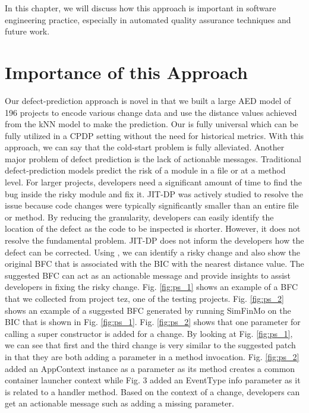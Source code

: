 In this chapter, we will discuss how this approach is important in software engineering practice, especially in automated quality assurance techniques and future work.

\section{Importance of this Approach}
Our defect-prediction approach is novel in that we built a large AED model of 196 projects to encode various change data and use the distance values achieved from the kNN model to make the prediction.
Our {\simfinmo} is fully universal which can be fully utilized in a CPDP setting without the need for historical metrics.
With this approach, we can say that the cold-start problem is fully alleviated.
Another major problem of defect prediction is the lack of actionable messages.
Traditional defect-prediction models predict the risk of a module in a file or at a method level.
For larger projects, developers need a significant amount of time to find the bug inside the risky module and fix it.
JIT-DP was actively studied to resolve the issue because code changes were typically significantly smaller than an entire file or method.
By reducing the granularity, developers can easily identify the location of the defect as the code to be inspected is shorter.
However, it does not resolve the fundamental problem.
JIT-DP does not inform the developers how the defect can be corrected.
Using {\simfinmo}, we can identify a risky change and also show the original BFC that is associated with the BIC with the nearest distance value.
The suggested BFC can act as an actionable message and provide insights to assist developers in fixing the risky change.
Fig. \ref{fig:ps_1} shows an example of a BFC that we collected from project tez, one of the testing projects.
Fig. \ref{fig:ps_2} shows an example of a suggested BFC generated by running SimFinMo on the BIC that is shown in Fig. \ref{fig:ps_1}.
Fig. \ref{fig:ps_2} shows that one parameter for calling a super constructor is added for a change.
By looking at Fig. \ref{fig:ps_1}, we can see that first and the third change is very similar to the suggested patch in that they are both adding a parameter in a method invocation.
Fig. \ref{fig:ps_2} added an AppContext instance as a parameter as its method creates a common container launcher context while Fig. 3 added an EventType info parameter as it is related to a handler method.
Based on the context of a change, developers can get an actionable message such as adding a missing parameter.

